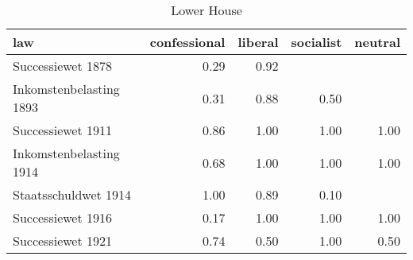 \begin{table}[ht]
\centering
\begin{tabular}{lrrrr}
  \hline
law & confessional & liberal & socialist & neutral \\ 
  \hline
Successiewet 1878 & 0.29 & 0.92 &  &  \\ 
  Inkomstenbelasting 1893 & 0.31 & 0.88 & 0.50 &  \\ 
  Successiewet 1911 & 0.86 & 1.00 & 1.00 & 1.00 \\ 
  Inkomstenbelasting 1914 & 0.68 & 1.00 & 1.00 & 1.00 \\ 
  Staatsschuldwet 1914 & 1.00 & 0.89 & 0.10 &  \\ 
  Successiewet 1916 & 0.17 & 1.00 & 1.00 & 1.00 \\ 
  Successiewet 1921 & 0.74 & 0.50 & 1.00 & 0.50 \\ 
   \hline
\end{tabular}
\caption{Lower House} 
\end{table}
